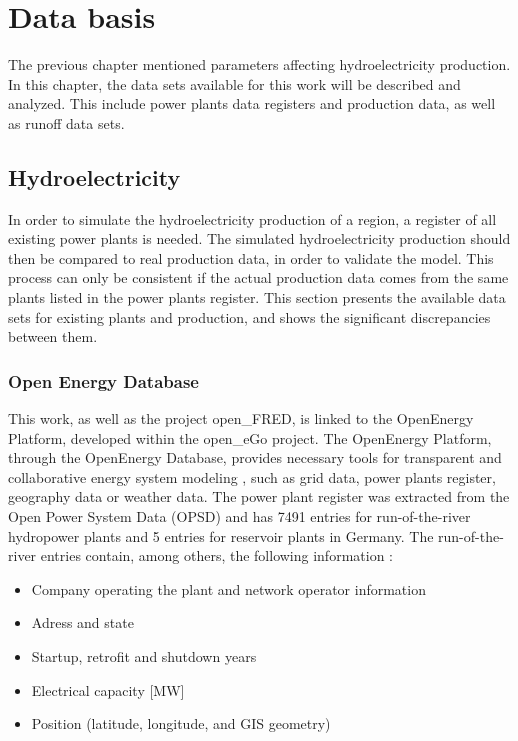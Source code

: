 \chapter{Data basis}
\label{chap:data_basis}

The previous chapter mentioned parameters affecting hydroelectricity production. In this chapter, the data sets available for this work will be described and analyzed. This include power plants data registers and production data, as well as runoff data sets. 

\section{Hydroelectricity}
\label{sec:db_hydroelec}
In order to simulate the hydroelectricity production of a region, a register of all existing power plants is needed. The simulated hydroelectricity production should then be compared to real production data, in order to validate the model. This process can only be consistent if the actual production data comes from the same plants listed in the power plants register. This section presents the available data sets for existing plants and production, and shows the significant discrepancies between them. 

\subsection{Open Energy Database}
\label{sub:hpp_reg}
This work, as well as the project open\_FRED, is linked to the OpenEnergy Platform, developed within the open\_eGo project. The OpenEnergy Platform, through the OpenEnergy Database, provides necessary tools for transparent and collaborative energy system modeling \cite{oedb}, such as grid data, power plants register, geography data or weather data. The power plant register was extracted from the Open Power System Data (OPSD) and has 7491 entries for run-of-the-river hydropower plants and 5 entries for reservoir plants in Germany. The run-of-the-river entries contain, among others, the following information :
\begin{itemize}
\itemsep-0.5em 
 \item Company operating the plant and network operator information
 \item Adress and state
 \item Startup, retrofit and shutdown years
 \item Electrical capacity [\unit{MW}]
 \item Position (latitude, longitude, and GIS geometry)
\end{itemize}

